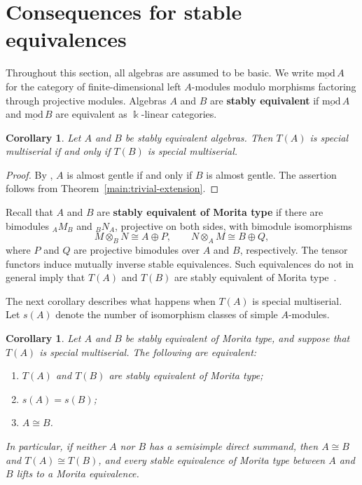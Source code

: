 \documentclass[11pt]{article}
\newcommand{\defn}[1]{\textbf{#1}}
\newtheorem{corollary}[theorem]{Corollary}
\theoremstyle{definition}
\begin{document}
\section{Consequences for stable equivalences}
\label{sec:stable-equivalences}

	Throughout this section, all algebras are assumed to be basic.
	We write $\underline{\mathrm{mod}}\,A$ for the category of finite-dimensional left $A$-modules modulo morphisms factoring through projective modules.
	Algebras $A$ and $B$ are \defn{stably equivalent} if $\underline{\mathrm{mod}}\,A$ and $\underline{\mathrm{mod}}\,B$ are equivalent as $\Bbbk$-linear categories.

	\begin{corollary}
		\label{cor:stable-special-multiserial}
		Let $A$ and $B$ be stably equivalent algebras.
		Then $T(A)$ is special multiserial if and only if $T(B)$ is special multiserial.
	\end{corollary}

	\begin{proof}
		By \cite[Theorem~6.4]{CX26}, $A$ is almost gentle if and only if $B$ is almost gentle.
		The assertion follows from Theorem~\ref{main:trivial-extension}.
	\end{proof}

	Recall that $A$ and $B$ are \defn{stably equivalent of Morita type} if there are bimodules ${}_AM_B$ and ${}_BN_A$, projective on both sides, with bimodule isomorphisms
	\[
		M\otimes_B N\cong A\oplus P,
		\qquad N\otimes_A M\cong B\oplus Q,
	\]
	where $P$ and $Q$ are projective bimodules over $A$ and $B$, respectively.
	The tensor functors induce mutually inverse stable equivalences.
	Such equivalences do not in general imply that $T(A)$ and $T(B)$ are stably equivalent of Morita type~\cite{LZZ17}. 

	The next corollary describes what happens when $T(A)$ is special multiserial.
	Let $s(A)$ denote the number of isomorphism classes of simple $A$-modules.

	\begin{corollary}
		\label{cor:morita-type-trivial-extensions}
		Let $A$ and $B$ be stably equivalent of Morita type, and suppose that $T(A)$ is special multiserial.
		The following are equivalent:
		\begin{enumerate}
			\item $T(A)$ and $T(B)$ are stably equivalent of Morita type;
			\item $s(A)=s(B)$;
			\item $A\cong B$.
		\end{enumerate}
		In particular, if neither $A$ nor $B$ has a semisimple direct summand, then $A\cong B$ and $T(A)\cong T(B)$, and every stable equivalence of Morita type between $A$ and $B$ lifts to a Morita equivalence.
	\end{corollary}
\end{document}
